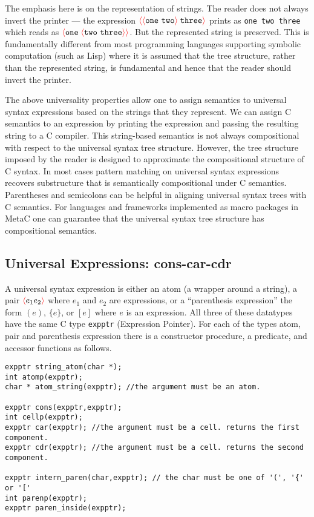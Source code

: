 \documentclass{article}
\newcommand{\fopen}{{\color{red} \langle}}
\newcommand{\fclose}{{\color{red} \rangle}}
\begin{document}
The emphasis here is on the representation of strings.  The reader does not always invert the printer ---
the expression $\fopen \fopen \mathtt{one~two} \fclose \;\mathtt{three}\fclose$ prints as {\tt one two three} which reads as
$\fopen \mathtt{one}\; \fopen \mathtt{two~three} \fclose \fclose$.  But the represented string is preserved.  This is fundamentally different from
most programming languages supporting symbolic computation (such as Lisp) where it is assumed that the tree structure, rather than the represented string, is fundamental
and hence that the reader should invert the printer.

The above universality properties allow one to assign semantics to universal syntax expressions based on the strings that they represent.  We can assign C
semantics to an expression by printing the expression and passing the resulting string to a C compiler.  This string-based semantics is not always
compositional with respect to the universal syntax tree structure.  However, the tree structure imposed by the reader is designed to approximate the
compositional structure of C syntax.  In most cases pattern matching on universal syntax expressions recovers substructure that is semantically compositional under C
semantics. Parentheses and semicolons can be helpful in aligning universal syntax trees with C semantics.
For languages and frameworks implemented as macro packages in MetaC one can guarantee that the universal syntax tree structure
has compositional semantics.

\subsection{Universal Expressions: cons-car-cdr}

A universal syntax expression is either an atom (a wrapper around a string),
a pair $\fopen e_1 e_2 \fclose$ where $e_1$ and $e_2$ are expressions, or a ``parenthesis expression'' the form $(e)$,
$\{ e\}$, or $[e]$ where $e$ is an expression.   All three of these datatypes have the same C type {\tt expptr} (Expression Pointer).
For each of the types atom, pair and parenthesis expression there is a constructor procedure, a predicate, and accessor functions as follows.

\begin{verbatim}
expptr string_atom(char *);
int atomp(expptr);
char * atom_string(expptr); //the argument must be an atom.

expptr cons(expptr,expptr);
int cellp(expptr);
expptr car(expptr); //the argument must be a cell. returns the first component.
expptr cdr(expptr); //the argument must be a cell. returns the second component.

expptr intern_paren(char,expptr); // the char must be one of '(', '{' or '['
int parenp(expptr);
expptr paren_inside(expptr);
\end{verbatim}
\end{document}
